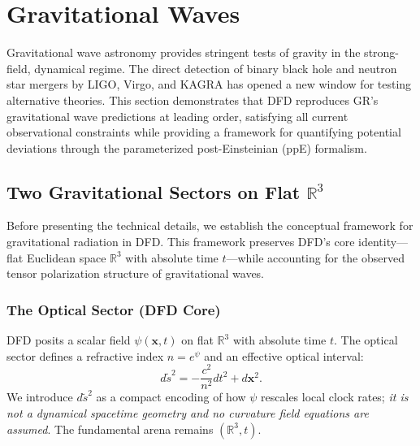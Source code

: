 
\section{Gravitational Waves}\label{sec:gw}

Gravitational wave astronomy provides stringent tests of gravity in the strong-field, dynamical regime. The direct detection of binary black hole and neutron star mergers by LIGO, Virgo, and KAGRA has opened a new window for testing alternative theories. This section demonstrates that DFD reproduces GR's gravitational wave predictions at leading order, satisfying all current observational constraints while providing a framework for quantifying potential deviations through the parameterized post-Einsteinian (ppE) formalism.

\subsection{Two Gravitational Sectors on Flat $\mathbb{R}^3$}\label{sec:gw-twosector}

Before presenting the technical details, we establish the conceptual framework for gravitational radiation in DFD. This framework preserves DFD's core identity---flat Euclidean space $\mathbb{R}^3$ with absolute time $t$---while accounting for the observed tensor polarization structure of gravitational waves.

\subsubsection{The Optical Sector (DFD Core)}

DFD posits a scalar field $\psi(\mathbf{x},t)$ on flat $\mathbb{R}^3$ with absolute time $t$. The optical sector defines a refractive index $n = e^{\psi}$ and an effective optical interval:
\begin{equation}\label{eq:optical-interval}
d\tilde{s}^2 = -\frac{c^2}{n^2}dt^2 + d\mathbf{x}^2.
\end{equation}
We introduce $d\tilde{s}^2$ as a compact encoding of how $\psi$ rescales local clock rates; \textit{it is not a dynamical spacetime geometry and no curvature field equations are assumed}. The fundamental arena remains $(\mathbb{R}^3, t)$.

